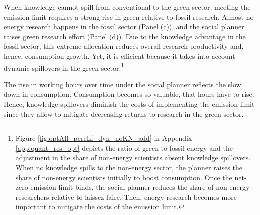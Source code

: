  When knowledge cannot spill from conventional to the green sector, meeting the emission limit requires a strong rise in green relative to fossil research. Almost no energy research happens in the fossil sector (Panel (c)), and the social planner raises green research effort (Panel (d)). Due to the knowledge advantage in the fossil sector, this extreme allocation reduces overall research productivity and, hence, consumption growth. Yet, it is efficient because it takes into account dynamic spillovers in the green sector.\footnote{ Figure \ref{fig:optAll_percLf_dyn_noKN_add} in Appendix \ref{app:quant_res_opt} depicts the ratio of green-to-fossil energy and the adjustment in the share of non-energy scientists absent knowledge spillovers. When no knowledge spills to the non-energy sector, the planner raises the share of non-energy scientists initially to boost consumption. Once the net-zero emission limit binds, the social planner reduces the share of non-energy researchers relative to laissez-faire. Then, energy research becomes more important to mitigate the costs of the emission limit.}
 
The rise in working hours over time under the social planner reflects the slow down in consumption. Consumption becomes so valuable, that hours have to rise. 
Hence, knowledge spillovers diminish the costs of implementing the emission limit since they allow to mitigate decreasing returns to research in the green sector. 


